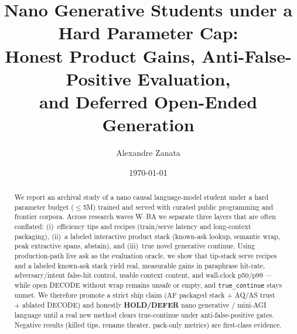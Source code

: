 \documentclass[11pt,a4paper]{article}
\title{Nano Generative Students under a Hard Parameter Cap:\\
Honest Product Gains, Anti-False-Positive Evaluation,\\
and Deferred Open-Ended Generation}
\author{Alexandre Zanata}
\date{\today}
\begin{document}
\maketitle

\begin{abstract}
We report an archival study of a nano causal language-model student under a hard
parameter budget ($\leq$5M) trained and served with curated public programming and
frontier corpora. Across research waves W--BA we separate three layers that are often
conflated: (i)~efficiency tips and recipes (train/serve latency and long-context
packaging), (ii)~a labeled interactive product stack (known-ask lookup, semantic wrap,
peak extractive spans, abstain), and (iii)~true novel generative continue.
Using production-path live ask as the evaluation oracle, we show that tip-stack
serve recipes and a labeled known-ask stack yield real, measurable gains in paraphrase
hit-rate, adversary/intent false-hit control, usable context content, and wall-clock
p50/p99 --- while open DECODE without wrap remains unsafe or empty, and
\texttt{true\_continue} stays unmet. We therefore promote a strict ship claim
(AF packaged stack + AQ/AS trust + ablated DECODE) and honestly \textbf{HOLD/DEFER}
nano generative / mini-AGI language until a real new method clears true-continue
under anti-false-positive gates. Negative results (killed tips, rename theater,
pack-only metrics) are first-class evidence.
\end{abstract}









\end{document}
